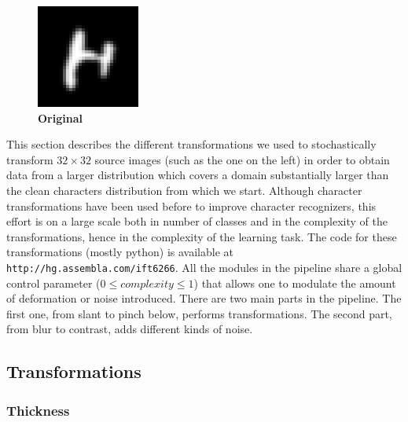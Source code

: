 \documentclass{article} %
\begin{document}
\begin{figure}
\begin{center}
\includegraphics[scale=.4]{images/Original.png}\\
{\bf Original}
\end{center}
\end{figure}
This section describes the different transformations we used to stochastically
transform $32 \times 32$ source images (such as the one on the left)
in order to obtain data from a larger distribution which
covers a domain substantially larger than the clean characters distribution from
which we start. 
Although character transformations have been used before to
improve character recognizers, this effort is on a large scale both
in number of classes and in the complexity of the transformations, hence
in the complexity of the learning task.
The code for these transformations (mostly python) is available at 
{\tt http://hg.assembla.com/ift6266}. All the modules in the pipeline share
a global control parameter ($0 \le complexity \le 1$) that allows one to modulate the
amount of deformation or noise introduced. 
There are two main parts in the pipeline. The first one,
from slant to pinch below, performs transformations. The second
part, from blur to contrast, adds different kinds of noise.

\subsection{Transformations}

\subsubsection*{Thickness}
\end{document}

